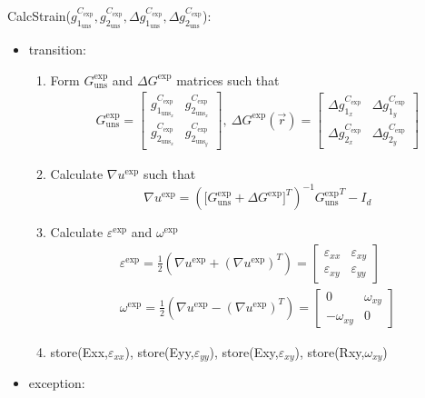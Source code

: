 \documentclass[12pt, titlepage]{article}
\begin{document}
\noindent CalcStrain($g_{1_{{\text{uns}}}}^{C_{\text{exp}}},g_{2_{{\text{uns}}}}^{C_{\text{exp}}},\Delta g_{1_{{\text{uns}}}}^{C_{\text{exp}}},\Delta g_{2_{{\text{uns}}}}^{C_{\text{exp}}}$):
\begin{itemize}
\item transition:
\begin{enumerate}
\item Form ${{G_{\text{uns}}^{\text{exp}}}}$ and $\Delta G^{\text{exp}}$ matrices such that
\begin{equation*}
\begin{gathered}
G_{\text{uns}}^{\text{exp}} =
	\begin{bmatrix}
	g_{1_{{\text{uns}}_x}}^{C_{\text{exp}}} & g_{2_{{\text{uns}}_x}}^{C_{\text{exp}}} \\
	g_{2_{{\text{uns}}_x}}^{C_{\text{exp}}} & g_{2_{{\text{uns}}_y}}^{C_{\text{exp}}} 
	\end{bmatrix}, \ 
\Delta G^{\text{exp}}(\vec{r})=
	\begin{bmatrix}
	\Delta g_{1_{x}}^{C_{\text{exp}}} & \Delta g_{1_{y}}^{C_{\text{exp}}}\\
	\Delta g_{2_{x}}^{C_{\text{exp}}} & \Delta g_{2_{y}}^{C_{\text{exp}}}
	\end{bmatrix}
\end{gathered}
\end{equation*}
\item Calculate $\nabla u^{\text{exp}}$ such that
\begin{equation*}
\nabla u^{\text{exp}} = ({[{G_{\text{uns}}^{\text{exp}}}+\Delta G^{\text{exp}}}]^{T})^{-1}{{G_{\text{uns}}^{\text{exp}}}}^{T}-I_{d}
\end{equation*}
\item Calculate $\varepsilon^{\text{exp}}$ and $\omega^{\text{exp}}$
\begin{equation*}
\begin{gathered}
\varepsilon^{\text{exp}} = \frac{1}{2}(\nabla u^{\text{exp}}+(\nabla u^{\text{exp}})^{T})= \begin{bmatrix}
	\varepsilon_{\mathit{xx}} & \varepsilon_{\mathit{xy}} \\
	\varepsilon_{\mathit{xy}} & \varepsilon_{\mathit{yy}}
	\end{bmatrix} \\
\omega^{\text{exp}} = \frac{1}{2}(\nabla u^{\text{exp}}-(\nabla u^{\text{exp}})^{T})= \begin{bmatrix}
	0 & \omega_{\mathit{xy}} \\
	-\omega_{\mathit{xy}} & 0
	\end{bmatrix}
\end{gathered}
\end{equation*}
\item store(Exx,$\varepsilon_{\mathit{xx}}$), store(Eyy,$\varepsilon_{\mathit{yy}}$), store(Exy,$\varepsilon_{\mathit{xy}}$), store(Rxy,$\omega_{\mathit{xy}}$) 
\end{enumerate}  
\item exception:
\end{itemize}
\end{document}
